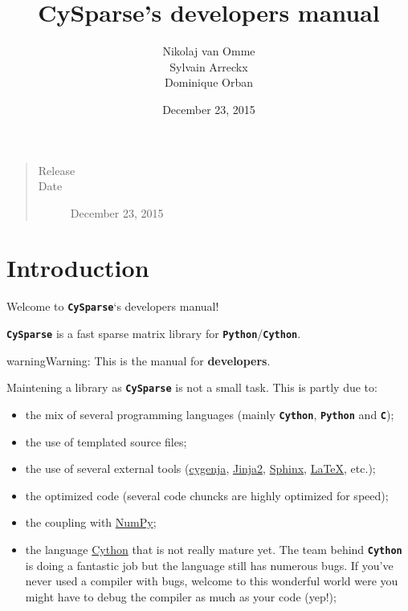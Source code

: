 \documentclass[letterpaper,10pt,english]{sphinxmanual}
\title{CySparse's developers manual}
\date{December 23, 2015}
\author{Nikolaj van Omme\\Sylvain Arreckx\\Dominique Orban}
\begin{document}
\maketitle
\tableofcontents
{}\label{contents::doc}

\begin{quote}\begin{description}
\item[{Release}] 

\item[{Date}] \leavevmode
December 23, 2015

\end{description}\end{quote}


\chapter{Introduction}
\label{introduction:introduction}\label{introduction::doc}\label{introduction:cysparse-s-developers-manual}
Welcome to \textbf{\texttt{CySparse}}`s developers manual!

\textbf{\texttt{CySparse}} is a fast sparse matrix library for \textbf{\texttt{Python}}/\textbf{\texttt{Cython}}.

\begin{notice}{warning}{Warning:}
This is the manual for \textbf{developers}.
\end{notice}

Maintening a library as \textbf{\texttt{CySparse}} is not a small task. This is partly due to:
\begin{itemize}
\item {} 
the mix of several programming languages (mainly \textbf{\texttt{Cython}}, \textbf{\texttt{Python}} and \textbf{\texttt{C}});

\item {} 
the use of templated source files;

\item {} 
the use of several external tools (\href{https://github.com/PythonOptimizers/cygenja}{cygenja}, \href{http://jinja.pocoo.org/}{Jinja2}, \href{http://sphinx-doc.org/}{Sphinx}, \href{https://www.latex-project.org/}{LaTeX}, etc.);

\item {} 
the optimized code (several code chuncks are highly optimized for speed);

\item {} 
the coupling with \href{http://www.numpy.org/}{NumPy};

\item {} 
the language \href{http://cython.org/}{Cython} that is not really mature yet. The team behind \textbf{\texttt{Cython}} is doing a fantastic job but the language still has numerous bugs. If you've never used a compiler with bugs, welcome to this wonderful world were you might have
to debug the compiler as much as your code (yep!);

\end{itemize}
\end{document}

